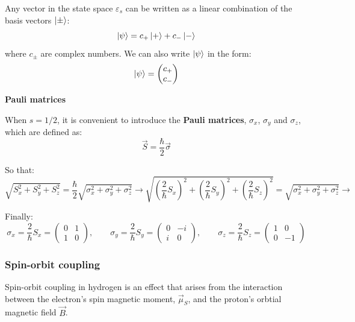 Any vector in the state space $\varepsilon_s$ can be written as a linear combination of the basis vectors $\ket{\pm}$:
\begin{equation}
    \ket{\psi} = c_+\ket{+} + c_-\ket{-}
\end{equation}
where $c_\pm$ are complex numbers. We can also write $\ket{\psi}$ in the form:
\begin{equation}
    \ket{\psi} = \begin{pmatrix}
        c_+ \\
        c_-
    \end{pmatrix}
\end{equation}

\textbf{Pauli matrices}

When $s=1/2$, it is convenient to introduce the \textbf{Pauli matrices}, $\sigma_x$, $\sigma_y$ and $\sigma_z$, which are defined as:
\begin{equation}
    \vec{S} = \frac{\hbar}{2}\vec{\sigma}
\end{equation}

So that:
\begin{equation}
    \sqrt{S_x^2+S_y^2+S_z^2} = \frac{\hbar}{2}\sqrt{\sigma_x^2+\sigma_y^2+\sigma_z^2}\longrightarrow \sqrt{\left(\frac{2}{\hbar}S_x\right)^2+\left(\frac{2}{\hbar}S_y\right)^2+\left(\frac{2}{\hbar}S_z\right)^2} = \sqrt{\sigma_x^2+\sigma_y^2+\sigma_z^2}\to
\end{equation}

Finally:
\begin{equation}
    \sigma_x = \frac{2}{\hbar}S_x = \begin{pmatrix}
        0 & 1 \\
        1 & 0
    \end{pmatrix}, \qquad \sigma_y = \frac{2}{\hbar}S_y = \begin{pmatrix}
        0 & -i \\
        i & 0
    \end{pmatrix}, \qquad \sigma_z = \frac{2}{\hbar}S_z = \begin{pmatrix}
        1 & 0 \\
        0 & -1
    \end{pmatrix} 
\end{equation}

\subsubsection{Spin-orbit coupling}

Spin-orbit coupling in hydrogen is an effect that arises from the interaction between the electron's spin magnetic moment, $\vec{\mu}_S$, and the proton's orbtial magnetic field $\vec{B}$.

